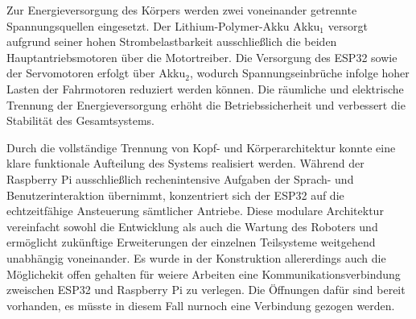 Zur Energieversorgung des Körpers werden zwei voneinander getrennte Spannungsquellen eingesetzt. Der Lithium-Polymer-Akku Akku$_1$ versorgt aufgrund seiner hohen Strombelastbarkeit ausschließlich die beiden Hauptantriebsmotoren über die Motortreiber. Die Versorgung des ESP32 sowie der Servomotoren erfolgt über Akku$_2$, wodurch Spannungseinbrüche infolge hoher Lasten der Fahrmotoren reduziert werden können. Die räumliche und elektrische Trennung der Energieversorgung erhöht die Betriebssicherheit und verbessert die Stabilität des Gesamtsystems.

Durch die vollständige Trennung von Kopf- und Körperarchitektur konnte eine klare funktionale Aufteilung des Systems realisiert werden. Während der Raspberry Pi ausschließlich rechenintensive Aufgaben der Sprach- und Benutzerinteraktion übernimmt, konzentriert sich der ESP32 auf die echtzeitfähige Ansteuerung sämtlicher Antriebe. Diese modulare Architektur vereinfacht sowohl die Entwicklung als auch die Wartung des Roboters und ermöglicht zukünftige Erweiterungen der einzelnen Teilsysteme weitgehend unabhängig voneinander. 
Es wurde in der Konstruktion allererdings auch die Möglichekit offen gehalten für weiere Arbeiten eine Kommunikationsverbindung zweischen ESP32 und Raspberry Pi zu verlegen. Die Öffnungen dafür sind bereit vorhanden, es müsste in diesem Fall nurnoch eine Verbindung gezogen werden.
